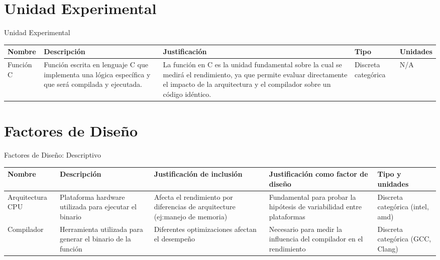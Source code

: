 \documentclass[aspectratio=169]{beamer}
\begin{document}
\section{Unidad Experimental}

\begin{frame}{Unidad Experimental}
    \begin{table}
        \begin{tabularx}{\textwidth}{|>{\raggedright\arraybackslash}p{2cm}|>{\raggedright\arraybackslash}X|>{\raggedright\arraybackslash}X|>{\raggedright\arraybackslash}p{2cm}|>{\raggedright\arraybackslash}p{1.5cm}|}
            \hline
            \textbf{Nombre} & \textbf{Descripción} & \textbf{Justificación} & \textbf{Tipo} & \textbf{Unidades} \\
            \hline
            Función C & Función escrita en lenguaje C que implementa una lógica específica y que será compilada y ejecutada. & La función en C es la unidad fundamental sobre la cual se medirá el rendimiento, ya que permite evaluar directamente el impacto de la arquitectura y el compilador sobre un código idéntico. & Discreta categórica & N/A \\
            \hline
        \end{tabularx}
    \end{table}
\end{frame}

\section{Factores de Diseño}

\begin{frame}{Factores de Diseño: Descriptivo}
    \begin{table}
        \begin{tabularx}{\textwidth}{|>{\raggedright\arraybackslash}p{2.5cm}|>{\raggedright\arraybackslash}X|>{\raggedright\arraybackslash}X|>{\raggedright\arraybackslash}X|>{\raggedright\arraybackslash}p{2.5cm}|}
            \hline
            \textbf{Nombre} & \textbf{Descripción} & \textbf{Justificación de inclusión} & \textbf{Justificación como factor de diseño} & \textbf{Tipo y unidades} \\
            \hline
            Arquitectura CPU & Plataforma hardware utilizada para ejecutar el binario & Afecta el rendimiento por diferencias de arquitecture (ej:manejo de memoria)& Fundamental para probar la hipótesis de variabilidad entre plataformas & Discreta categórica (intel, amd) \\
            \hline
            Compilador & Herramienta utilizada para generar el binario de la función & Diferentes optimizaciones afectan el desempeño & Necesario para medir la influencia del compilador en el rendimiento & Discreta categórica (GCC, Clang) \\
            \hline
        \end{tabularx}
    \end{table}
\end{frame}
\end{document}
